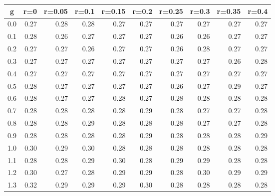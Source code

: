 %
\begin{table}[!tbp]
 \begin{center}
 \begin{tabular}{rrrrrrrrrr}\hline\hline
\multicolumn{1}{c}{g}&\multicolumn{1}{c}{r=0}&\multicolumn{1}{c}{r=0.05}&\multicolumn{1}{c}{r=0.1}&\multicolumn{1}{c}{r=0.15}&\multicolumn{1}{c}{r=0.2}&\multicolumn{1}{c}{r=0.25}&\multicolumn{1}{c}{r=0.3}&\multicolumn{1}{c}{r=0.35}&\multicolumn{1}{c}{r=0.4}\tabularnewline
\hline
0.0&0.27&0.28&0.28&0.27&0.27&0.27&0.27&0.27&0.27\tabularnewline
0.1&0.28&0.26&0.27&0.27&0.27&0.26&0.26&0.27&0.27\tabularnewline
0.2&0.27&0.27&0.26&0.27&0.27&0.26&0.28&0.27&0.27\tabularnewline
0.3&0.27&0.27&0.27&0.27&0.27&0.27&0.27&0.26&0.28\tabularnewline
0.4&0.27&0.27&0.27&0.27&0.27&0.27&0.27&0.27&0.27\tabularnewline
0.5&0.28&0.27&0.27&0.27&0.27&0.26&0.27&0.29&0.27\tabularnewline
0.6&0.28&0.27&0.27&0.28&0.27&0.28&0.28&0.28&0.28\tabularnewline
0.7&0.28&0.28&0.28&0.28&0.29&0.28&0.27&0.27&0.28\tabularnewline
0.8&0.28&0.28&0.29&0.28&0.28&0.28&0.27&0.27&0.28\tabularnewline
0.9&0.28&0.28&0.28&0.28&0.29&0.28&0.28&0.28&0.29\tabularnewline
1.0&0.30&0.29&0.30&0.28&0.28&0.28&0.28&0.28&0.28\tabularnewline
1.1&0.28&0.28&0.29&0.30&0.28&0.29&0.29&0.28&0.28\tabularnewline
1.2&0.30&0.27&0.28&0.29&0.29&0.28&0.30&0.29&0.29\tabularnewline
1.3&0.32&0.29&0.29&0.29&0.30&0.28&0.28&0.28&0.28\tabularnewline
\hline
\end{tabular}

\end{center}

\end{table}


